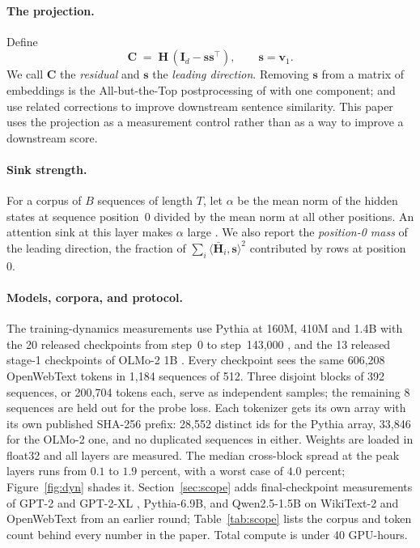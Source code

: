 \documentclass{article}
\theoremstyle{spaced}
\theoremstyle{definition}
\newcommand{\bH}{\mathbf{H}}
\newcommand{\bC}{\mathbf{C}}
\newcommand{\bs}{\mathbf{s}}
\newcommand{\bv}{\mathbf{v}}
\newcommand{\bI}{\mathbf{I}}
\begin{document}
\paragraph{The projection.} Define
\begin{equation}
\label{eq:proj}
\bC \;=\; \bH\,(\bI_d - \bs\bs^\top), \qquad \bs = \bv_1 .
\end{equation}
We call $\bC$ the \emph{residual} and $\bs$ the \emph{leading direction}. Removing $\bs$ from a matrix of embeddings is the All-but-the-Top postprocessing of \citet{mu2018allbutthetop} with one component; \citet{li2020sentence} and \citet{rajaee2021cluster} use related corrections to improve downstream sentence similarity. This paper uses the projection as a measurement control rather than as a way to improve a downstream score.

\paragraph{Sink strength.} For a corpus of $B$ sequences of length $T$, let $\alpha$ be the mean norm of the hidden states at sequence position~$0$ divided by the mean norm at all other positions. An attention sink at this layer makes $\alpha$ large \citep{xiao2024efficient,sun2024massive}. We also report the \emph{position-0 mass} of the leading direction, the fraction of $\sum_i \langle \bar{\bH}_i, \bs\rangle^2$ contributed by rows at position~$0$.

\paragraph{Models, corpora, and protocol.} The training-dynamics measurements use Pythia at 160M, 410M and 1.4B with the 20 released checkpoints from step~0 to step~143{,}000 \citep{biderman2023pythia}, and the 13 released stage-1 checkpoints of OLMo-2 1B \citep{olmo2025olmo2}. Every checkpoint sees the same 606{,}208 OpenWebText tokens \citep{gokaslan2019openwebtext} in 1{,}184 sequences of 512. Three disjoint blocks of 392 sequences, or 200{,}704 tokens each, serve as independent samples; the remaining 8 sequences are held out for the probe loss. Each tokenizer gets its own array with its own published SHA-256 prefix: 28{,}552 distinct ids for the Pythia array, 33{,}846 for the OLMo-2 one, and no duplicated sequences in either. Weights are loaded in float32 and all layers are measured. The median cross-block spread at the peak layers runs from $0.1$ to $1.9$ percent, with a worst case of $4.0$ percent; Figure~\ref{fig:dyn} shades it. Section~\ref{sec:scope} adds final-checkpoint measurements of GPT-2 and GPT-2-XL \citep{radford2019language}, Pythia-6.9B, and Qwen2.5-1.5B \citep{qwen2024qwen25} on WikiText-2 \citep{merity2017pointer} and OpenWebText from an earlier round; Table~\ref{tab:scope} lists the corpus and token count behind every number in the paper. Total compute is under 40 GPU-hours.
\end{document}

